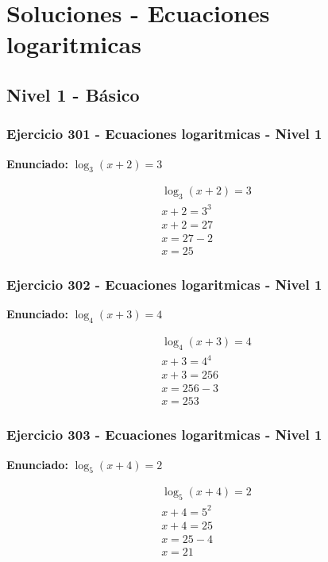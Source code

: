 \documentclass[12pt,a4paper]{article}
\begin{document}
\newpage
\section*{Soluciones - Ecuaciones logaritmicas}

\subsection*{Nivel 1 - Básico}

\subsubsection*{Ejercicio 301 - Ecuaciones logaritmicas - Nivel 1}
\textbf{Enunciado:} \(\log_{3}\left(x+2\right)=3\)

\[
\begin{aligned}
\log_{3}\left(x+2\right)=3\\
x+2=3^{3}\\
x+2=27\\
x=27-2\\
\boxed{x=25}
\end{aligned}
\]


\subsubsection*{Ejercicio 302 - Ecuaciones logaritmicas - Nivel 1}
\textbf{Enunciado:} \(\log_{4}\left(x+3\right)=4\)

\[
\begin{aligned}
\log_{4}\left(x+3\right)=4\\
x+3=4^{4}\\
x+3=256\\
x=256-3\\
\boxed{x=253}
\end{aligned}
\]


\subsubsection*{Ejercicio 303 - Ecuaciones logaritmicas - Nivel 1}
\textbf{Enunciado:} \(\log_{5}\left(x+4\right)=2\)

\[
\begin{aligned}
\log_{5}\left(x+4\right)=2\\
x+4=5^{2}\\
x+4=25\\
x=25-4\\
\boxed{x=21}
\end{aligned}
\]
\end{document}
